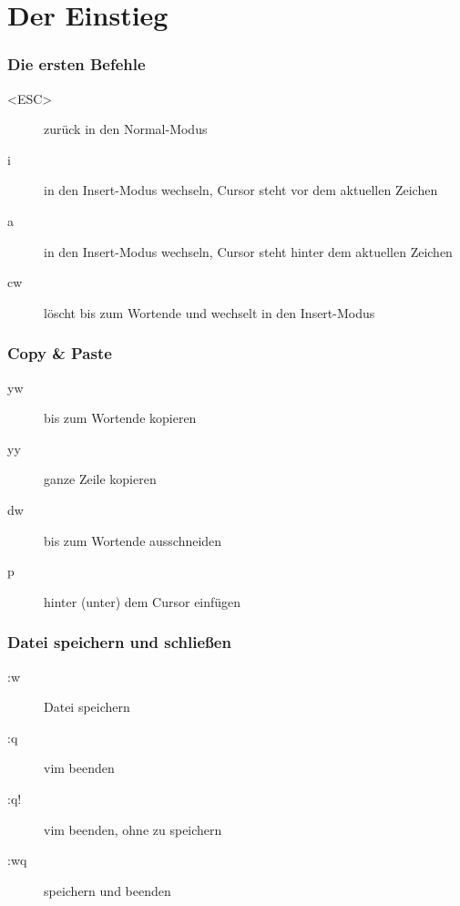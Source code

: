 \documentclass[aspectratio=1610,svgnames]{beamer}
\newcommand{\divider}[1]{\begin{frame} %
\begin{alertblock}{} %
\centering\usebeamerfont{section title}#1 %
\end{alertblock} %
\end{frame}}
\begin{document}
\section{Der Einstieg}
\divider{\insertsection}
\begin{frame}[<+->]
    \frametitle{Die ersten Befehle}
    \begin{description}
        \item[<ESC>] zurück in den Normal-Modus
        \item[i] in den Insert-Modus wechseln, Cursor steht vor dem aktuellen Zeichen
        \item[a] in den Insert-Modus wechseln, Cursor steht hinter dem aktuellen Zeichen
        \item[cw] löscht bis zum Wortende und wechselt in den Insert-Modus
    \end{description}
\end{frame}
\begin{frame}[<+->]
    \frametitle{Copy \& Paste}
    \begin{description}
        \item[yw] bis zum Wortende kopieren
        \item[yy] ganze Zeile kopieren
        \item[dw] bis zum Wortende ausschneiden
        \item[p] hinter (unter) dem Cursor einfügen
    \end{description}
\end{frame}
\begin{frame}[<+->]
    \frametitle{Datei speichern und schließen}
    \begin{description}
        \item[:w] Datei speichern
        \item[:q] vim beenden
        \item[:q!] vim beenden, ohne zu speichern
        \item[:wq] speichern und beenden
    \end{description}
\end{frame}
\end{document}
